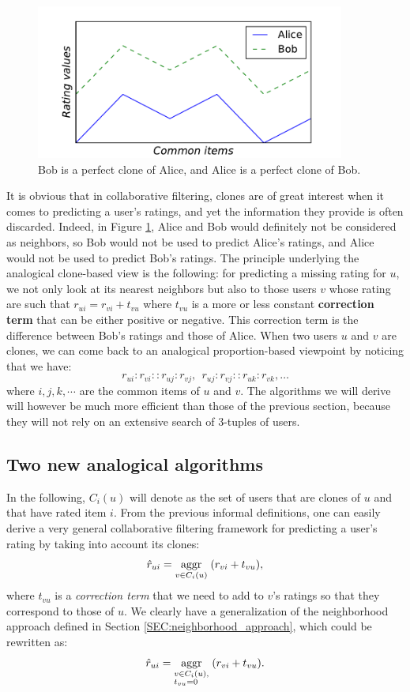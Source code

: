 \begin{figure}[!h]
\centering
\includegraphics[width=4in]{figures/clones.pdf}
\caption{Bob is a perfect clone of Alice, and Alice is a perfect clone of Bob.}
\label{FIG:alice_and_bob_clones}
\end{figure}

It is obvious that in collaborative filtering, clones are of great interest
when it comes to predicting a user's ratings, and yet the information they provide
is often discarded. Indeed, in Figure \ref{FIG:alice_and_bob_clones}, Alice and
Bob would definitely not be considered as neighbors, so Bob would not be used to
predict Alice's ratings, and Alice would not be used to predict Bob's ratings.
The principle underlying the analogical clone-based view is the following: for
predicting a missing rating for $u$, we not only look at its nearest neighbors
but also to those users $v$ whose rating are such that $r_{ui} = r_{vi} + t_{vu}$
where $t_{vu}$ is a more or less constant \textbf{correction term} that can be
either positive or negative. This correction term is the difference between
Bob's ratings and those of Alice. When two users $u$ and $v$ are clones, we can
come back to an analogical proportion-based viewpoint by noticing that we have:
$$r_{ui} : r_{vi} :: r_{uj} : r_{vj},~~ r_{uj} : r_{vj} :: r_{uk} : r_{vk},
\dots$$
where $i, j, k, \cdots$ are the common items of $u$ and $v$. The algorithms we
will derive will however be much more efficient than those of the previous
section, because they will not rely on an extensive search of 3-tuples of
users.


\subsection{Two new analogical algorithms}

In the following, $C_i(u)$ will denote as the set of users that are clones of
$u$ and that have rated item $i$. From the previous informal definitions, one
can easily derive a very general collaborative filtering framework for
predicting a user's rating by taking into account its clones: $$\hat{r}_{ui} =
\underset{v \in C_i(u)}{\operatorname{aggr}}\;(r_{vi} + t_{vu}),$$
where $t_{vu}$ is a \textit{correction term} that we need to add to $v$'s
ratings so that they correspond to those of $u$. We clearly have a
generalization of the neighborhood approach defined in Section \ref{SEC:neighborhood_approach},
which could be rewritten as:
$$\hat{r}_{ui} = \underset{\begin{subarray}{l}v \in C_i(u),\\ t_{vu} = 0\end{subarray}}{\operatorname{aggr}}\;(r_{vi} + t_{vu}).$$

